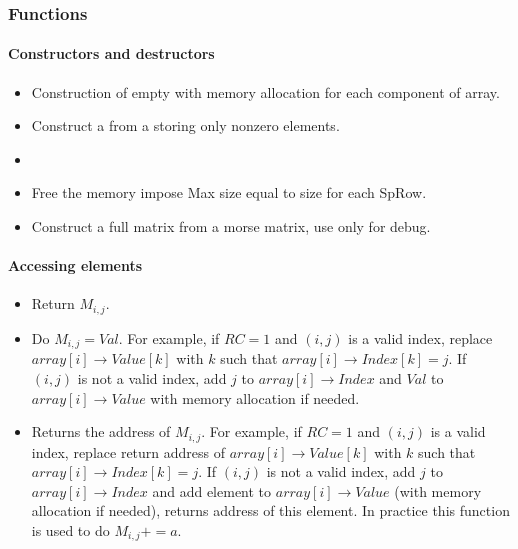 \subsubsection{Functions}
\paragraph{Constructors and destructors}
\begin{itemize}
\item {}
  \sshortdescribe Construction of empty  with memory
  allocation for each component of array. 
\item
  \sshortdescribe Construct a  from  a  storing only nonzero elements.
\item {}
\item {}
  \sshortdescribe Free the memory impose Max size equal to size for each SpRow.
\item {}
  \sshortdescribe Construct a full matrix from a morse matrix, use only for debug.
\end{itemize}
\paragraph{Accessing elements}
\begin{itemize}
\item {}
  \sshortdescribe Return $M_{i, j}$. 
\item {}
  \sshortdescribe Do $M_{i, j} = Val$. For example, if $RC=1$ and $(i, j)$ is a valid index, replace
  $array[i]\rightarrow Value[k]$ with $k$ such that $array[i]\rightarrow Index[k]=j$.
  If $(i, j)$ is not a valid index, add $j$ to $array[i]\rightarrow Index$ and $Val$ to
  $array[i] \rightarrow Value$ with memory allocation if needed. 
\item {}
  \sshortdescribe Returns the address of $M_{i, j}$. For example, 
  if $RC=1$ and $(i, j)$ is a valid index, replace return address of
  $array[i]\rightarrow Value[k]$ with $k$ such that $array[i]\rightarrow
  Index[k]=j$.  If $(i, j)$ is not a valid index, add $j$ to
  $array[i]\rightarrow Index$ and add element to $array[i] \rightarrow Value$
  (with memory allocation if needed), returns address of this element. In
  practice this function is used to do $M_{i, j} += a$.
\end{itemize}

